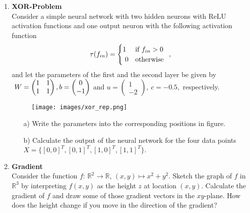 \documentclass[paper=a4, fontsize=11pt]{scrartcl} %
\numberwithin{equation}{section} %
\numberwithin{figure}{section} %
\numberwithin{table}{section} %
\begin{document}
\begin{enumerate}
\item\textbf{XOR-Problem}\\
Consider a simple neural network with two hidden neurons with ReLU activation functions and one output neuron with the following activation function
\[
\tau(f_{in})=\begin{cases} 1 & \text{if $ f_{in}>0$}\\\ 0 & \text{otherwise}  
\end{cases}\enspace,
\]
and let the parameters of the first and the second layer be given by
$\ W = \begin{pmatrix}
      1 & 1 \\
      1 & 1
    \end{pmatrix}, \\
      b = \begin{pmatrix}
      0 \\
      -1
    \end{pmatrix}$
    and $
      u = \begin{pmatrix}
      1 \\
      -2
    \end{pmatrix}, \
      c =-0.5,
 $
respectively.
\begin{figure}[H]\label{fig:nn}
\center
    \texttt{[image: images/xor\_rep.png]}%
  \end{figure}
  \begin{itemize}
  \item[a)]  Write the parameters into the corresponding positions in figure.
  \item[b)] Calculate the output of the neural network for the four data points \\ $X = \{[0,0]^T, [0,1]^T, [1,0]^T, [1,1]^T \}$.
  \end{itemize}
  
  \item \textbf{Gradient}\\
  Consider the function
  $f:\,\mathbb{R}^2\to\mathbb{R}$,
  $(x,y)\mapsto x^2+y^2$.
  Sketch the graph of $f$ in $\mathbb{R}^3$
  by interpreting $f(x,y)$ as the height $z$ at location $(x,y)$.
  Calculate the gradient of $f$
  and draw some of those gradient vectors
  in the $xy$-plane.
  How does the height change if you
  move in the direction of the gradient?  
  
  
  
 
  
\end{enumerate}


\end{document}
